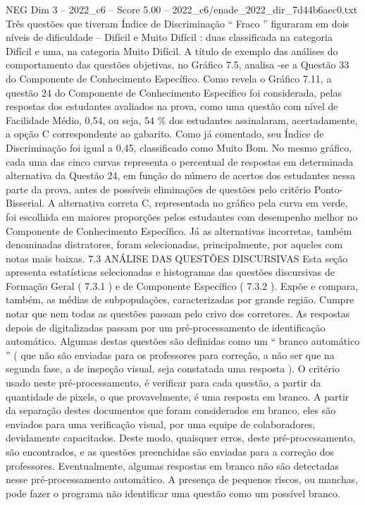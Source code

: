 \begin{textsample}{NEG Dim 3 – 2022\_c6 – Score 5.00 – 2022\_c6/enade\_2022\_dir\_7d44b6aec0.txt}
Três questões que tiveram Índice de Discriminação “ Fraco ” figuraram em dois níveis de dificuldade – Difícil e Muito Difícil : duas classificada na categoria Difícil e uma, na categoria Muito Difícil.
A título de exemplo das análises do comportamento das questões objetivas, no Gráfico 7.5, analisa -se a Questão 33 do Componente de Conhecimento Específico.
Como revela o Gráfico 7.11, a questão 24 do Componente de Conhecimento Específico foi considerada, pelas respostas dos estudantes avaliados na prova, como uma questão com nível de Facilidade Médio, 0,54, ou seja, 54 \% dos estudantes assinalaram, acertadamente, a opção C correspondente ao gabarito.
Como já comentado, seu Índice de Discriminação foi igual a 0,45, classificado como Muito Bom.
No mesmo gráfico, cada uma das cinco curvas representa o percentual de respostas em determinada alternativa da Questão 24, em função do número de acertos dos estudantes nessa parte da prova, antes de possíveis eliminações de questões pelo critério Ponto-Bisserial.
A alternativa correta C, representada no gráfico pela curva em verde, foi escolhida em maiores proporções pelos estudantes com desempenho melhor no Componente de Conhecimento Específico.
Já as alternativas incorretas, também denominadas distratores, foram selecionadas, principalmente, por aqueles com notas mais baixas. 7.3 ANÁLISE DAS QUESTÕES DISCURSIVAS Esta seção apresenta estatísticas selecionadas e histogramas das questões discursivas de Formação Geral ( 7.3.1 ) e de Componente Específico ( 7.3.2 ).
Expõe e compara, também, as médias de subpopulações, caracterizadas por grande região.
Cumpre notar que nem todas as questões passam pelo crivo dos corretores.
As respostas depois de digitalizadas passam por um pré-processamento de identificação automático.
Algumas destas questões são definidas como um “ branco automático ” ( que não são enviadas para os professores para correção, a não ser que na segunda fase, a de inspeção visual, seja constatada uma resposta ).
O critério usado neste pré-processamento, é verificar para cada questão, a partir da quantidade de pixels, o que provavelmente, é uma resposta em branco.
A partir da separação destes documentos que foram considerados em branco, eles são enviados para uma verificação visual, por uma equipe de colaboradores, devidamente capacitados.
Deste modo, quaisquer erros, deste pré-processamento, são encontrados, e as questões preenchidas são enviadas para a correção dos professores.
Eventualmente, algumas respostas em branco não são detectadas nesse pré-processamento automático.
A presença de pequenos riscos, ou manchas, pode fazer o programa não identificar uma questão como um possível branco.

\end{textsample}
